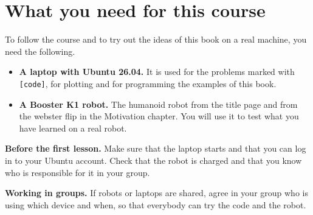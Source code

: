 \chapter*{What you need for this course}

To follow the course and to try out the ideas of this book on a real machine, you need the following.

\begin{keyidea}[Requirements]
\begin{itemize}[nosep]
  \item \textbf{A laptop with Ubuntu 26.04.} It is used for the problems marked with \texttt{[code]}, for plotting and for programming the examples of this book.
  \item \textbf{A Booster K1 robot.} The humanoid robot from the title page and from the webster flip in the Motivation chapter. You will use it to test what you have learned on a real robot.
\end{itemize}
\end{keyidea}

\textbf{Before the first lesson.} Make sure that the laptop starts and that you can log in to your Ubuntu account. Check that the robot is charged and that you know who is responsible for it in your group.

\textbf{Working in groups.} If robots or laptops are shared, agree in your group who is using which device and when, so that everybody can try the code and the robot.
